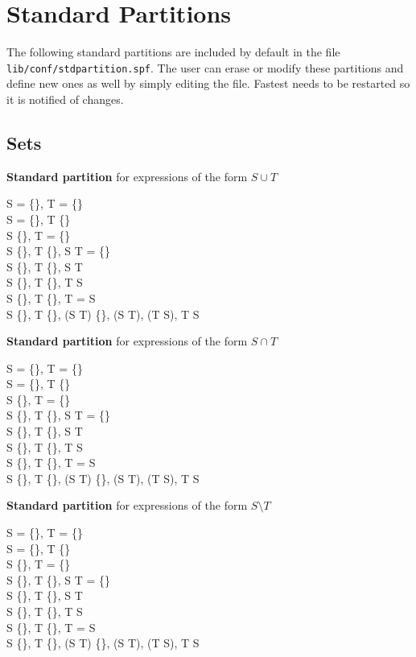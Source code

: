 \section {\label{sp}Standard Partitions}

The following standard partitions are included by default in the file \verb+lib/conf/stdpartition.spf+. The user can erase or modify these partitions and define new ones as well by simply editing the file. Fastest needs to be restarted so it is notified of changes.

\subsection{Sets}

\noindent\textbf{Standard partition} for expressions of the form $S \cup T$
\begin{zed}
S = \{\}, T = \{\} \\
S = \{\}, T \neq \{\} \\
S \neq \{\}, T = \{\} \\
S \neq \{\}, T \neq \{\}, S \cap T = \{\} \\
S \neq \{\}, T \neq \{\}, S \subset T \\
S \neq \{\}, T \neq \{\}, T \subset S \\
S \neq \{\}, T \neq \{\}, T = S \\
S \neq \{\}, T \neq \{\}, (S \cap T) \neq \{\}, \lnot(S \subseteq T), \lnot (T \subseteq S), T \neq S
\end{zed}

\noindent\textbf{Standard partition} for expressions of the form $S \cap T$
\begin{zed}
S = \{\}, T = \{\} \\
S = \{\}, T \neq \{\} \\
S \neq \{\}, T = \{\} \\
S \neq \{\}, T \neq \{\}, S \cap T = \{\} \\
S \neq \{\}, T \neq \{\}, S \subset T \\
S \neq \{\}, T \neq \{\}, T \subset S \\
S \neq \{\}, T \neq \{\}, T = S \\
S \neq \{\}, T \neq \{\}, (S \cap T) \neq \{\}, \lnot(S \subseteq T), \lnot (T \subseteq S), T \neq S
\end{zed}



\noindent\textbf{Standard partition} for expressions of the form $S \setminus T$
\begin{zed}
S = \{\}, T = \{\} \\
S = \{\}, T \neq \{\} \\
S \neq \{\}, T = \{\} \\
S \neq \{\}, T \neq \{\}, S \cap T = \{\} \\
S \neq \{\}, T \neq \{\}, S \subset T \\
S \neq \{\}, T \neq \{\}, T \subset S \\
S \neq \{\}, T \neq \{\}, T = S \\
S \neq \{\}, T \neq \{\}, (S \cap T) \neq \{\}, \lnot(S \subseteq T), \lnot (T \subseteq S), T \neq S
\end{zed}

